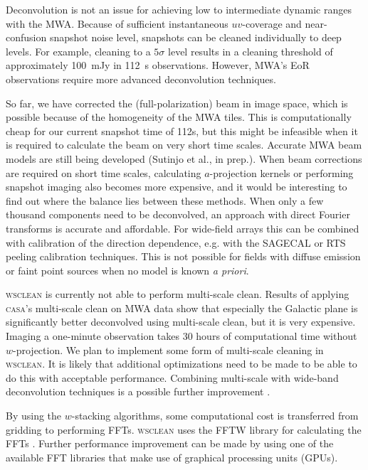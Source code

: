 \documentclass[useAMS,usenatbib]{mn2e}
\begin{document}
Deconvolution is not an issue for achieving low to intermediate dynamic ranges with the MWA. Because of sufficient instantaneous $uv$-coverage and near-confusion snapshot noise level, snapshots can be cleaned individually to deep levels. For example, cleaning to a $5\sigma$ level results in a cleaning threshold of approximately 100~mJy in 112~s observations. However, MWA's EoR observations \citep{bowman-science-with-the-mwa-2013} require more advanced deconvolution techniques.

So far, we have corrected the (full-polarization) beam in image space, which is possible because of the homogeneity of the MWA tiles. This is computationally cheap for our current snapshot time of 112s, but this might be infeasible when it is required to calculate the beam on very short time scales. Accurate MWA beam models are still being developed (Sutinjo et al., in prep.). When beam corrections are required on short time scales, calculating $a$-projection kernels or performing snapshot imaging also becomes more expensive, and it would be interesting to find out where the balance lies between these methods. When only a few thousand components need to be deconvolved, an approach with direct Fourier transforms is accurate and affordable. For wide-field arrays this can be combined with calibration of the direction dependence, e.g. with the SAGECAL \citep{sage-calibration-ii} or RTS peeling \citep{rts-mwa} calibration techniques. This is not possible for fields with diffuse emission or faint point sources when no model is known \textit{a priori}.

\textsc{wsclean} is currently not able to perform multi-scale clean. Results of applying \textsc{casa}'s multi-scale clean \citep{multiscale-clean-cornwell-2008} on MWA data show that especially the Galactic plane is significantly better deconvolved using multi-scale clean, but it is very expensive. Imaging a one-minute observation takes 30 hours of computational time without $w$-projection. We plan to implement some form of multi-scale cleaning in \textsc{wsclean}. It is likely that additional optimizations need to be made to be able to do this with acceptable performance. Combining multi-scale with wide-band deconvolution techniques is a possible further improvement \citep{rau-msmfs-2011}.

By using the $w$-stacking algorithms, some computational cost is transferred from gridding to performing FFTs. \textsc{wsclean} uses the FFTW library for calculating the FFTs \citep{fftw-2005}. Further performance improvement can be made by using one of the available FFT libraries that make use of graphical processing units (GPUs).
\end{document}
